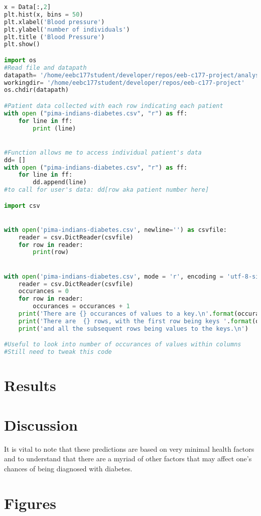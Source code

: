 \documentclass [letterpaper]{article}
\begin{document}
\begin{lstlisting}[language=Python]
x = Data[:,2]
plt.hist(x, bins = 50)
plt.xlabel('Blood pressure')
plt.ylabel('number of individuals')
plt.title ('Blood Pressure')
plt.show()

import os
#Read file and datapath
datapath= '/home/eebc177student/developer/repos/eeb-c177-project/analyses'
workingdir= '/home/eebc177student/developer/repos/eeb-c177-project'
os.chdir(datapath)

#Patient data collected with each row indicating each patient
with open ("pima-indians-diabetes.csv", "r") as ff: 
    for line in ff:
        print (line)


#Function allows me to access individual patient's data
dd= []
with open ("pima-indians-diabetes.csv", "r") as ff: 
    for line in ff:
        dd.append(line)
#to call for user's data: dd[row aka patient number here]

import csv


with open('pima-indians-diabetes.csv', newline='') as csvfile:
    reader = csv.DictReader(csvfile)
    for row in reader:
        print(row)


with open('pima-indians-diabetes.csv', mode = 'r', encoding = 'utf-8-sig') as csvfile:
    reader = csv.DictReader(csvfile)
    occurances = 0
    for row in reader:
        occurances = occurances + 1
    print('There are {} occurances of values to a key.\n'.format(occurances))
    print('There are  {} rows, with the first row being keys '.format(occurances+1))
    print('and all the subsequent rows being values to the keys.\n')

#Useful to look into number of occurances of values within columns
#Still need to tweak this code

\end{lstlisting}

\section{Results}

\section{Discussion}
It is vital to note that these predictions are based on very minimal health factors and to understand that there are a myriad of other factors that may affect one's chances of being diagnosed with diabetes.

\section{Figures}
\end{document}
